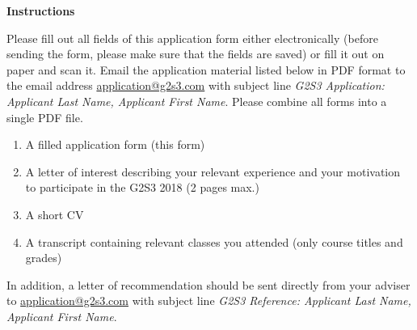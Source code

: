 \documentclass[12pt]{article}
\begin{document}
\begin{center}
\large  
\textbf{Instructions}
\end{center}
\noindent
Please fill out all fields of this application form either
electronically (before sending the form, please make sure that the
fields are saved) or fill it out on paper and scan it.
Email the application material listed below in PDF format to the email address
\href{mailto:application@g2s3.com}{application@g2s3.com} with
subject line \textsl{G2S3 Application: Applicant Last Name, Applicant
  First Name}. Please combine all forms into a single PDF file.\\[1ex]
%
\begin{enumerate}
\item A filled application form (this form)\hspace{-1ex}
\item A letter of interest describing your relevant experience and your motivation to participate in the G2S3 2018 (2 pages max.)\hspace{-1ex}
\item A short CV\hspace{-1ex}
\item A transcript containing relevant classes you attended (only course titles and grades)
\end{enumerate}
\noindent{}In addition, a letter of recommendation should be sent directly from your adviser to \href{mailto:application@g2s3.com}{application@g2s3.com} with subject line \textsl{G2S3 Reference: Applicant Last Name, Applicant First Name}.\\

\\
\pagestyle{empty}
\end{document}
